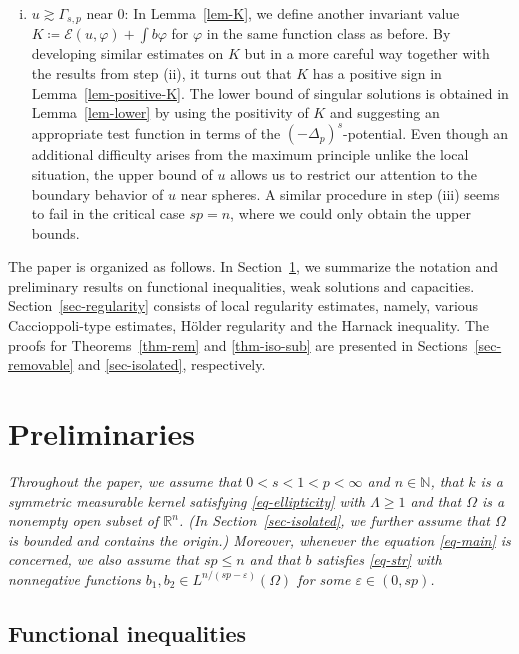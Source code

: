 \documentclass[11pt]{amsart}
\theoremstyle{plain}
\theoremstyle{definition}
\numberwithin{equation}{section}
\begin{document}
\begin{enumerate}[(i)]
         \item $u \gtrsim \Gamma_{s,p}$ near $0$: In Lemma~\ref{lem-K}, we define another invariant value $K\coloneqq \mathcal{E}(u, \varphi)+\int b \varphi$ for $\varphi$ in the same function class as before. By developing similar estimates on $K$ but in a more careful way together with the results from step (ii), it turns out that $K$ has a positive sign in Lemma~\ref{lem-positive-K}. The lower bound of singular solutions is obtained in Lemma~\ref{lem-lower}  by using the positivity of $K$ and suggesting an appropriate test function in terms of the $(-\Delta_p)^s$-potential. Even though an additional difficulty arises from the maximum principle unlike the local situation, the upper bound of $u$ allows us to restrict our attention to the boundary behavior of $u$ near spheres. A similar procedure in step (iii) seems to fail in the critical case $sp=n$, where we could only obtain the upper bounds.
	\end{enumerate}


	The paper is organized as follows. In Section~\ref{sec-preliminaries}, we summarize the notation and preliminary results on functional inequalities, weak solutions and capacities. Section~\ref{sec-regularity} consists of local regularity estimates, namely, various Caccioppoli-type estimates, H\"older regularity and the Harnack inequality. The proofs for Theorems~\ref{thm-rem} and \ref{thm-iso-sub} are presented in Sections~\ref{sec-removable} and \ref{sec-isolated}, respectively.





\section{Preliminaries}\label{sec-preliminaries}

\emph{Throughout the paper, we assume that $0<s<1<p<\infty$ and $n \in \mathbb{N}$, that $k$ is a symmetric measurable kernel satisfying \eqref{eq-ellipticity} with $\Lambda \geq 1$ and that $\Omega$ is a nonempty open subset of $\mathbb{R}^n$. (In Section~\ref{sec-isolated}, we further assume that $\Omega$ is bounded and contains the origin.) Moreover, whenever the equation \eqref{eq-main} is concerned, we also assume that $sp\leq n$ and that $b$ satisfies \eqref{eq-str} with nonnegative functions $b_1, b_2 \in L^{n/(sp-\varepsilon)}(\Omega)$ for some $\varepsilon \in (0, sp)$.}

\subsection{Functional inequalities}
\end{document}
